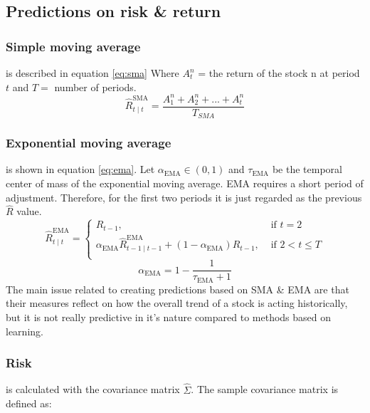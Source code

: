 \documentclass[final]{LTHtwocol} %
\begin{document}
\subsection{Predictions on risk \& return}
\subsubsection{Simple moving average} is described in equation \ref{eq:sma} Where $A^n_t$ = the return of the stock n at period $t$ and $T =$ number of periods.
\begin{equation} 
\label{eq:sma}
 \hat{R}_{t \mid t}^{\mathrm{SMA}} = \frac{A^n_1+A^n_2+...+A^n_t}{T_{SMA}}
\end{equation}

\subsubsection{Exponential moving average}
 is shown in equation \ref{eq:ema}. Let $\alpha_{\text{EMA}}\in (0,1)$ and $\tau_{\text{EMA}}$ be the temporal center of mass of the exponential moving average. EMA requires a short period of adjustment. Therefore, for the first two periods it is just regarded as the previous $\hat{R}$ value. \cite{ref:ema}
\begin{equation}
    \label{eq:ema}
    \hat{R}_{t \mid t}^{\mathrm{EMA}}=\left\{\begin{array}{ll}
    R_{t-1}, & \text { if } t=2 \\
    \alpha_{\mathrm{EMA}} \hat{R}_{t-1 \mid t-1}^{\mathrm{EMA}}+\left(1-\alpha_{\mathrm{EMA}}\right) R_{t-1}, & \text { if } 2<t \leq T\\
    \end{array}\right. 
\end{equation}
\begin{equation}
     \alpha_{\text{EMA}} = 1 - \frac{1}{\tau_{\text{EMA}} + 1}
\end{equation}
The main issue related to creating predictions based on SMA \& EMA are that their measures reflect on how the overall trend of a stock is acting historically, but it is not really predictive in it's nature compared to methods based on learning.

\subsubsection{Risk} is calculated with the covariance matrix $\hat \Sigma$. The sample covariance matrix is defined as:
\end{document}
